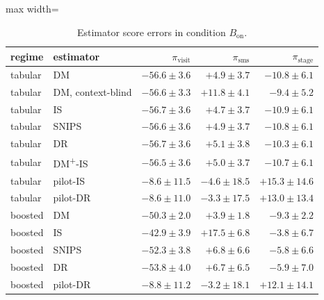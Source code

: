 \begin{table}[!htbp]
\centering
\caption{Estimator score errors in condition $B_{\mathrm{on}}$.}
\label{tab:campaignfullerrorsB_on}
\small
\begin{adjustbox}{max width=\linewidth}
\begin{tabular}{llrrr}
\toprule
regime & estimator & $\pi_{\mathrm{visit}}$ & $\pi_{\mathrm{sms}}$ & $\pi_{\mathrm{stage}}$ \\
\midrule
tabular & DM & $-56.6 \pm 3.6$ & $+4.9 \pm 3.7$ & $-10.8 \pm 6.1$ \\
tabular & DM, context-blind & $-56.6 \pm 3.3$ & $+11.8 \pm 4.1$ & $-9.4 \pm 5.2$ \\
tabular & IS & $-56.7 \pm 3.6$ & $+4.7 \pm 3.7$ & $-10.9 \pm 6.1$ \\
tabular & SNIPS & $-56.6 \pm 3.6$ & $+4.9 \pm 3.7$ & $-10.8 \pm 6.1$ \\
tabular & DR & $-56.7 \pm 3.6$ & $+5.1 \pm 3.8$ & $-10.3 \pm 6.1$ \\
tabular & DM\textsuperscript{+}-IS & $-56.5 \pm 3.6$ & $+5.0 \pm 3.7$ & $-10.7 \pm 6.1$ \\
tabular & pilot-IS & $-8.6 \pm 11.5$ & $-4.6 \pm 18.5$ & $+15.3 \pm 14.6$ \\
tabular & pilot-DR & $-8.6 \pm 11.0$ & $-3.3 \pm 17.5$ & $+13.0 \pm 13.4$ \\
boosted & DM & $-50.3 \pm 2.0$ & $+3.9 \pm 1.8$ & $-9.3 \pm 2.2$ \\
boosted & IS & $-42.9 \pm 3.9$ & $+17.5 \pm 6.8$ & $-3.8 \pm 6.7$ \\
boosted & SNIPS & $-52.3 \pm 3.8$ & $+6.8 \pm 6.6$ & $-5.8 \pm 6.6$ \\
boosted & DR & $-53.8 \pm 4.0$ & $+6.7 \pm 6.5$ & $-5.9 \pm 7.0$ \\
boosted & pilot-DR & $-8.8 \pm 11.2$ & $-3.2 \pm 18.1$ & $+12.1 \pm 14.1$ \\
\bottomrule
\end{tabular}
\end{adjustbox}
\end{table}
